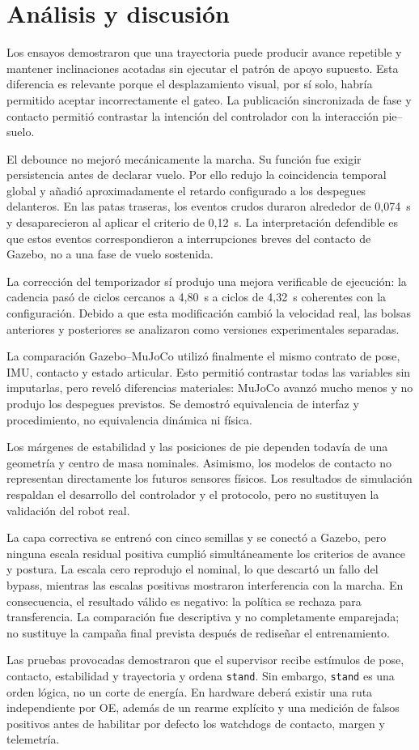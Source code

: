 \chapter{Análisis y discusión}

Los ensayos demostraron que una trayectoria puede producir avance repetible y
mantener inclinaciones acotadas sin ejecutar el patrón de apoyo supuesto. Esta
diferencia es relevante porque el desplazamiento visual, por sí solo, habría
permitido aceptar incorrectamente el gateo. La publicación sincronizada de
fase y contacto permitió contrastar la intención del controlador con la
interacción pie--suelo.

El debounce no mejoró mecánicamente la marcha. Su función fue exigir
persistencia antes de declarar vuelo. Por ello redujo la coincidencia temporal
global y añadió aproximadamente el retardo configurado a los despegues
delanteros. En las patas traseras, los eventos crudos duraron alrededor de
0,074~s y desaparecieron al aplicar el criterio de 0,12~s. La interpretación
defendible es que estos eventos correspondieron a interrupciones breves del
contacto de Gazebo, no a una fase de vuelo sostenida.

La corrección del temporizador sí produjo una mejora verificable de ejecución:
la cadencia pasó de ciclos cercanos a 4,80~s a ciclos de 4,32~s coherentes con
la configuración. Debido a que esta modificación cambió la velocidad real, las
bolsas anteriores y posteriores se analizaron como versiones experimentales
separadas.

La comparación Gazebo--MuJoCo utilizó finalmente el mismo contrato de pose,
IMU, contacto y estado articular. Esto permitió contrastar todas las variables
sin imputarlas, pero reveló diferencias materiales: MuJoCo avanzó mucho menos y
no produjo los despegues previstos. Se demostró equivalencia de interfaz y
procedimiento, no equivalencia dinámica ni física.

Los márgenes de estabilidad y las posiciones de pie dependen todavía de una
geometría y centro de masa nominales. Asimismo, los modelos de contacto no
representan directamente los futuros sensores físicos. Los resultados de
simulación respaldan el desarrollo del controlador y el protocolo, pero no
sustituyen la validación del robot real.

La capa correctiva se entrenó con cinco semillas y se conectó a Gazebo, pero
ninguna escala residual positiva cumplió simultáneamente los criterios de
avance y postura. La escala cero reprodujo el nominal, lo que descartó un fallo
del bypass, mientras las escalas positivas mostraron interferencia con la
marcha. En consecuencia, el resultado válido es negativo: la política se
rechaza para transferencia. La comparación fue descriptiva y no completamente
emparejada; no sustituye la campaña final prevista después de rediseñar el
entrenamiento.

Las pruebas provocadas demostraron que el supervisor recibe estímulos de pose,
contacto, estabilidad y trayectoria y ordena \texttt{stand}. Sin embargo,
\texttt{stand} es una orden lógica, no un corte de energía. En hardware deberá
existir una ruta independiente por OE, además de un rearme explícito y una
medición de falsos positivos antes de habilitar por defecto los watchdogs de
contacto, margen y telemetría.

